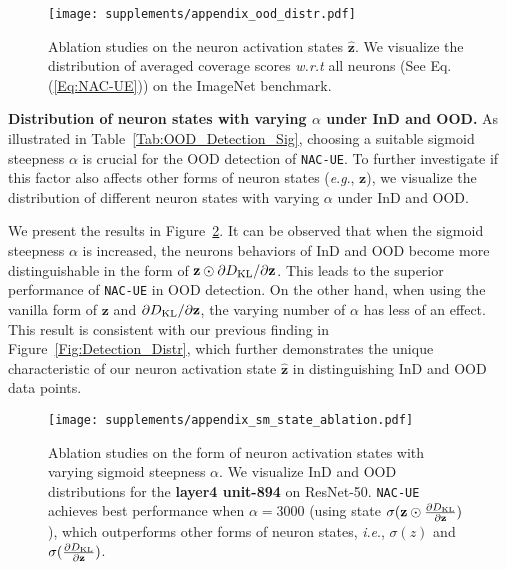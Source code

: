 \documentclass{article} \usepackage{iclr2024_conference,times}
\newcommand{\ie}{\textit{i}.\textit{e}.}
\newcommand{\eg}{\textit{e}.\textit{g}.}
\newcommand{\bfstart}[1]{\noindent\textbf{#1.}}
\begin{document}
\begin{figure*}[t]
	\centering \texttt{[image: supplements/appendix\_ood\_distr.pdf]} \caption{Ablation studies on the neuron activation states $\hat{\mathbf{z}}$.  We visualize the distribution of averaged coverage scores \textit{w.r.t} all neurons (See Eq.(\ref{Eq:NAC-UE})) on the ImageNet benchmark.}
	\label{Appendix:Fig:OOD_Distr}
\end{figure*}



\bfstart{Distribution of neuron states with varying $\alpha$ under InD and OOD} 
As illustrated in Table~\ref{Tab:OOD_Detection_Sig}, choosing a suitable sigmoid steepness $\alpha$ is crucial for the OOD detection of \texttt{NAC-UE}. 
To further investigate if this factor also affects other forms of neuron states (\eg, $\mathbf{z}$), we visualize the distribution of different neuron states with varying $\alpha$ under InD and OOD. 


We present the results in Figure~\ref{Appendix:Fig:OOD_sm_analysis}. It can be observed that when the sigmoid steepness $\alpha$ is increased, the neurons behaviors of InD and OOD become more distinguishable in the form of $\mathbf{z} \odot \partial D_{\rm KL}/\partial \mathbf{z}$. This leads to the superior performance of \texttt{NAC-UE} in OOD detection. 
On the other hand, when using the vanilla form of ${\mathbf{z}}$ and $\partial D_{\rm KL}/\partial \mathbf{z}$, the varying number of $\alpha$ has less of an effect. 
This result is consistent with our previous finding in Figure~\ref{Fig:Detection_Distr}, which further demonstrates the unique characteristic of our neuron activation state $\hat{\mathbf{z}}$ in distinguishing InD and OOD data points.










\begin{figure*}[t]
	\centering \texttt{[image: supplements/appendix\_sm\_state\_ablation.pdf]} \vspace{-2mm}
	\caption{Ablation studies on the form of neuron activation states with varying sigmoid steepness $\alpha$. We visualize InD and OOD distributions for the \textbf{layer4 unit-894} on ResNet-50. \texttt{NAC-UE} achieves best performance when $\alpha=3000$ (using state $\sigma(\mathbf{z} \odot \frac{\partial{D_{\rm KL}}}{\partial \mathbf{z}})$), which outperforms other forms of neuron states, \ie, $\sigma(z)$ and $\sigma(\frac{\partial{D_{\rm KL}}}{\partial \mathbf{z}})$.}
	\label{Appendix:Fig:OOD_sm_analysis}
\end{figure*}
\end{document}
